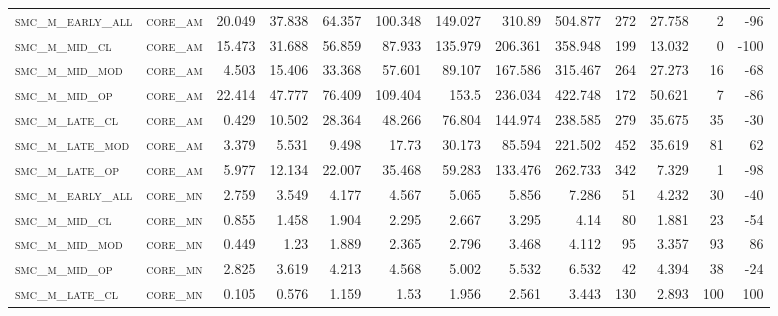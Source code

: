 \begin{landscape}
\begin{center}
\begin{footnotesize}
\begin{longtable}{llrrrrrrrr|rrr}
\textsc{smc\_m\_early\_all} & \textsc{core\_am  }   & 20.049   & 37.838   & 64.357   & 100.348  & 149.027  & 310.89   & 504.877  & 272    & 27.758        & 2             & -96             \\
\textsc{smc\_m\_mid\_cl   } & \textsc{core\_am  }   & 15.473   & 31.688   & 56.859   & 87.933   & 135.979  & 206.361  & 358.948  & 199    & 13.032        & 0             & -100            \\
\textsc{smc\_m\_mid\_mod  } & \textsc{core\_am  }   & 4.503    & 15.406   & 33.368   & 57.601   & 89.107   & 167.586  & 315.467  & 264    & 27.273        & 16            & -68             \\
\textsc{smc\_m\_mid\_op   } & \textsc{core\_am  }   & 22.414   & 47.777   & 76.409   & 109.404  & 153.5    & 236.034  & 422.748  & 172    & 50.621        & 7             & -86             \\
\textsc{smc\_m\_late\_cl  } & \textsc{core\_am  }   & 0.429    & 10.502   & 28.364   & 48.266   & 76.804   & 144.974  & 238.585  & 279    & 35.675        & 35            & -30             \\
\textsc{smc\_m\_late\_mod } & \textsc{core\_am  }   & 3.379    & 5.531    & 9.498    & 17.73    & 30.173   & 85.594   & 221.502  & 452    & 35.619        & 81            & 62              \\
\textsc{smc\_m\_late\_op  } & \textsc{core\_am  }   & 5.977    & 12.134   & 22.007   & 35.468   & 59.283   & 133.476  & 262.733  & 342    & 7.329         & 1             & -98             \\
\textsc{smc\_m\_early\_all} & \textsc{core\_mn  }   & 2.759    & 3.549    & 4.177    & 4.567    & 5.065    & 5.856    & 7.286    & 51     & 4.232         & 30            & -40             \\
\textsc{smc\_m\_mid\_cl   } & \textsc{core\_mn  }   & 0.855    & 1.458    & 1.904    & 2.295    & 2.667    & 3.295    & 4.14     & 80     & 1.881         & 23            & -54             \\
\textsc{smc\_m\_mid\_mod  } & \textsc{core\_mn  }   & 0.449    & 1.23     & 1.889    & 2.365    & 2.796    & 3.468    & 4.112    & 95     & 3.357         & 93            & 86              \\
\textsc{smc\_m\_mid\_op   } & \textsc{core\_mn  }   & 2.825    & 3.619    & 4.213    & 4.568    & 5.002    & 5.532    & 6.532    & 42     & 4.394         & 38            & -24             \\
\textsc{smc\_m\_late\_cl  } & \textsc{core\_mn  }   & 0.105    & 0.576    & 1.159    & 1.53     & 1.956    & 2.561    & 3.443    & 130    & 2.893         & 100           & 100             \\

\end{longtable}
\end{footnotesize}
\end{center}
\end{landscape}
